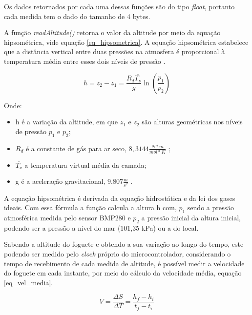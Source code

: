 \par Os dados retornados por cada uma dessas funções são do tipo \textit{float}, portanto cada medida tem o dado do tamanho de 4 bytes.

\par A função \textit{readAltitude()} retorna o valor da altitude por meio da equação hipsométrica, vide equação \ref{eq_hipsometrica}. A equação hipsométrica estabelece que a distância vertical entre duas pressões na atmosfera é proporcional à temperatura média entre esses dois níveis de pressão \cite{hipsometric}.

\begin{center}
\begin{equation}
\label{eq_hipsometrica}
h=z_{2}-z_{1}=\frac{R_{d} \overline{T_{\nu}}}{g} \ln \left(\frac{p_{1}}{p_{2}}\right)
\end{equation}
\end{center}

Onde:
\begin{itemize}
    \item h é a variação da altitude, em que $z_{1}$ e $z_{2}$ são alturas geométricas nos níveis de pressão $p_{1}$ e $p_{2}$;
	\item $R_{d}$ é a constante de gás para ar seco, $8,3144 \frac{N*m}{mol*K}$ ;
	\item $\overline{T_{\nu}}$ a temperatura virtual média da camada;
	\item g é a aceleração gravitacional, $9.807 \frac{m}{s^{2}}$ .
\end{itemize} 

\par A equação hipsométrica é derivada da equação hidrostática e da lei dos gases ideais. Com essa fórmula a função calcula a altura h com, $p_{1}$ sendo a pressão atmosférica medida pelo sensor BMP280 e $p_{2}$ a pressão inicial da altura inicial, podendo ser a pressão a nível do mar (101,35 kPa) ou a do local.

\par Sabendo a altitude do foguete e obtendo a sua variação ao longo do tempo, este podendo ser medido pelo  \textit{clock} próprio do microcontrolador, considerando o tempo de recebimento de cada medida de altitude, é possível medir a velocidade do foguete em cada instante, por meio do cálculo da velocidade média, equação \ref{eq_vel_media}.

\begin{center}
\begin{equation}
\label{eq_vel_media}
V = \frac{\Delta S} {\Delta T} = \frac{h_{f} - h_{i}}{t_{f} - t_{i}}
\end{equation}
\end{center}

